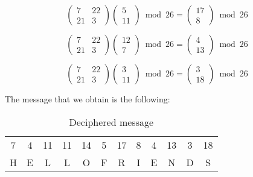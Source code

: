 \documentclass[titlepage, 12pt]{article}
\numberwithin{equation}{section}%
\numberwithin{figure}{section}%
\numberwithin{table}{section}%
\begin{document}
\begin{enumerate}
		\begin{equation*}
			\begin{pmatrix}
			7 & 22 \\
			21 & 3
			\end{pmatrix}
			\begin{pmatrix}
			5 \\
			11
			\end{pmatrix}\bmod{26} = 
			\begin{pmatrix}
			17 \\
			8
			\end{pmatrix}\bmod{26}
		\end{equation*}
		
		\begin{equation*}
			\begin{pmatrix}
			7 & 22 \\
			21 & 3
			\end{pmatrix}
			\begin{pmatrix}
			12 \\
			7
			\end{pmatrix}\bmod{26} = 
			\begin{pmatrix}
			4 \\
			13
			\end{pmatrix}\bmod{26}
		\end{equation*}
		
		\begin{equation*}
			\begin{pmatrix}
			7 & 22 \\
			21 & 3
			\end{pmatrix}
			\begin{pmatrix}
			3 \\
			11
			\end{pmatrix}\bmod{26} = 
			\begin{pmatrix}
			3 \\
			18
			\end{pmatrix}\bmod{26}
		\end{equation*}		
		
		The message that we obtain is the following:
		
		\begin{table}[H]
			\centering
			\caption{Deciphered message}
			\begin{tabular}{cccccccccccc}
			7&4&11&11&14&5&17&8&4&13&3&18\\
			H&E&L&L&O&F&R&I&E&N&D&S
			\end{tabular}
		\end{table}
		\end{enumerate}
\end{document}
